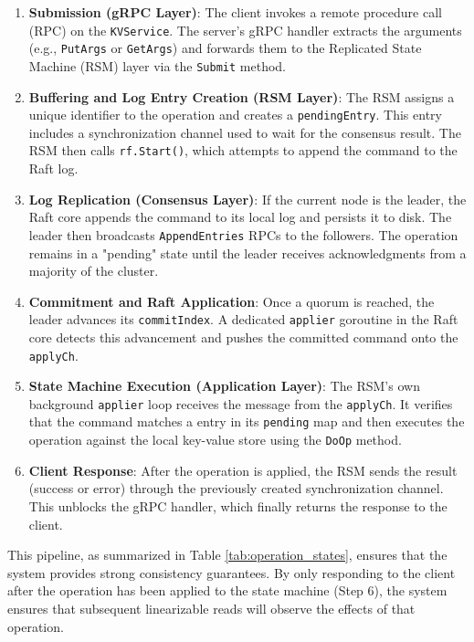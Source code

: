 \begin{enumerate}
    \item \textbf{Submission (gRPC Layer)}: The client invokes a remote procedure call (RPC) on the \texttt{KVService}. The server's gRPC handler extracts the arguments (e.g., \texttt{PutArgs} or \texttt{GetArgs}) and forwards them to the Replicated State Machine (RSM) layer via the \texttt{Submit} method.
    
    \item \textbf{Buffering and Log Entry Creation (RSM Layer)}: The RSM assigns a unique identifier to the operation and creates a \texttt{pendingEntry}. This entry includes a synchronization channel used to wait for the consensus result. The RSM then calls \texttt{rf.Start()}, which attempts to append the command to the Raft log.
    
    \item \textbf{Log Replication (Consensus Layer)}: If the current node is the leader, the Raft core appends the command to its local log and persists it to disk. The leader then broadcasts \texttt{AppendEntries} RPCs to the followers. The operation remains in a "pending" state until the leader receives acknowledgments from a majority of the cluster.
    
    \item \textbf{Commitment and Raft Application}: Once a quorum is reached, the leader advances its \texttt{commitIndex}. A dedicated \texttt{applier} goroutine in the Raft core detects this advancement and pushes the committed command onto the \texttt{applyCh}.
    
    \item \textbf{State Machine Execution (Application Layer)}: The RSM's own background \texttt{applier} loop receives the message from the \texttt{applyCh}. It verifies that the command matches a entry in its \texttt{pending} map and then executes the operation against the local key-value store using the \texttt{DoOp} method.
    
    \item \textbf{Client Response}: After the operation is applied, the RSM sends the result (success or error) through the previously created synchronization channel. This unblocks the gRPC handler, which finally returns the response to the client.
\end{enumerate}

This pipeline, as summarized in Table \ref{tab:operation_states}, ensures that the system provides strong consistency guarantees. By only responding to the client after the operation has been applied to the state machine (Step 6), the system ensures that subsequent linearizable reads will observe the effects of that operation.

